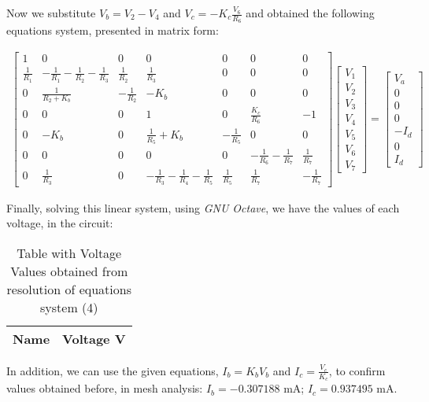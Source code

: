 Now we substitute $V_b=V_2-V_4$ and $V_c=-K_c\frac{V_6}{R_6}$ and obtained the following equations system, presented in matrix form:

\begin{gather}
    \begin{bmatrix}
     1 & 0 & 0 & 0 & 0 & 0 & 0  \\
     \frac{1}{R_1} & -\frac{1}{R_1}-\frac{1}{R_2}-\frac{1}{R_3} &\frac{1}{R_2} & \frac{1}{R_3} & 0 & 0 & 0\\
     0 & \frac{1}{R_2+K_b} & -\frac{1}{R_2}& -K_b & 0 & 0 & 0\\
     0 & 0 & 0 & 1 & 0 & \frac{K_c}{R_6} & -1\\
     0 & -K_b & 0 & \frac{1}{R_5}+K_b & -\frac{1}{R_5} & 0 & 0\\
     0 & 0 & 0 & 0 & 0 & -\frac{1}{R_6}-\frac{1}{R_7} & \frac{1}{R_7}\\
     0 & \frac{1}{R_3} & 0 & -\frac{1}{R_3}-\frac{1}{R_4}-\frac{1}{R_5} & \frac{1}{R_5} & \frac{1}{R_7} & -\frac{1}{R_7}
    \end{bmatrix}
    \begin{bmatrix}
     V_1\\
     V_2\\
     V_3\\
     V_4\\
     V_5\\
     V_6\\
     V_7
    \end{bmatrix}
    =
    \begin{bmatrix}
     V_a\\
     0\\
     0\\
     0\\
     -I_d\\
     0\\
     I_d
    \end{bmatrix}
\end{gather}


Finally, solving this linear system, using \textit{GNU Octave}, we have the values of each voltage, in the circuit:

\begin{table}[h]
  \centering
  \begin{tabular}{|l|r|}
    \hline    
    {\bf Name} & {\bf Voltage V} \\ \hline
    
 \end{tabular}
 \caption{Table with Voltage Values obtained from resolution of equations system (4)}
  \label{tab:op}
\end{table}

In addition, we can use the given equations, $I_b=K_bV_b$ and $I_c=\frac{V_c}{K_c}$, to confirm values obtained before, in mesh analysis: $I_b=-0.307188$ mA; $I_c=0.937495$ mA.






